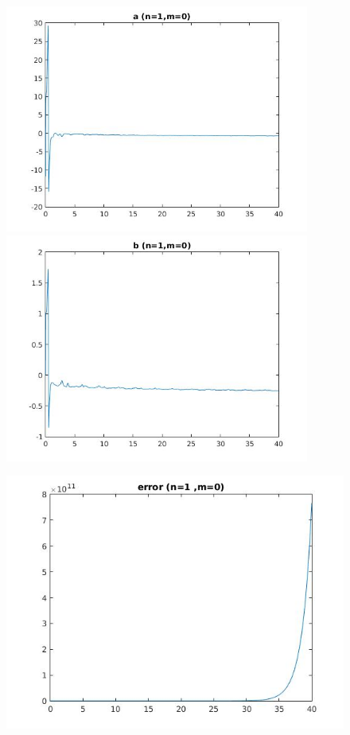 \documentclass{article}
\begin{document}
\begin{figure}[h!]
\centering 
 	  \begin{minipage}{0.48\textwidth}
     \centering
     \advance\leftskip-4cm
  \includegraphics[width=100mm,scale=2]{assets/try10o.jpg}
   \end{minipage} \hfill
    \begin{minipage}{0.48\textwidth}
  \includegraphics[width=100mm,scale=2]{assets/try10oo.jpg}
  \end{minipage}
\end{figure}
\begin{figure}[h!]
\centering
\advance\leftskip-0.5cm
 \includegraphics[width=140mm,scale=2]{assets/try10ooo.jpg}
\end{figure}
\end{document}
